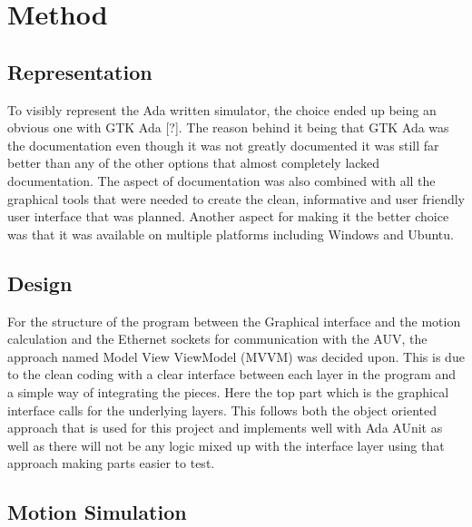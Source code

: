 \section{Method}\label{sec:method}



\subsection{Representation}

To visibly represent the Ada written simulator, the choice ended up being an obvious one with GTK Ada [?]. The reason behind it being that GTK Ada was the documentation even though it was not greatly documented it was still far better than any of the other options that almost completely lacked documentation. The aspect of documentation was also combined with all the graphical tools that were needed to create the clean, informative and user friendly user interface that was planned. Another aspect for making it the better choice was that it was available on multiple platforms including Windows and Ubuntu.
\subsection{Design}

For the structure of the program between the Graphical interface and the motion calculation and the Ethernet sockets for communication with the AUV, the approach named Model View ViewModel (MVVM) was decided upon. This is due to the clean coding with a clear interface between each layer in the program and a simple way of integrating the pieces. Here the top part which is the graphical interface calls for the underlying layers. This follows both the object oriented approach that is used for this project and implements well with Ada AUnit as well as there will not be any logic mixed up with the interface layer using that approach making parts easier to test.
\subsection{Motion Simulation}

